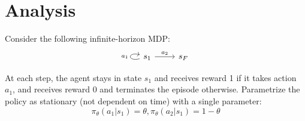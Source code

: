 \documentclass{article}
\begin{document}
\newpage\section{Analysis}
\label{sec:analysis}
Consider the following infinite-horizon MDP:
\[\begin{tikzcd}
	s_1 & {s_F}
	\arrow["{a_2}", from=1-1, to=1-2]
    \arrow["{a_1}", loop left, from=1-1, to=1-1]
\end{tikzcd}\]
\newcommand{\Rmax}[0]{R_{\textrm{max}}}
\newcommand{\E}[0]{\mathbb{E}}
\newcommand{\var}[0]{\textrm{Var}}
\newcommand\question[1][]{\item\refstepcounter{subsection}\label[question]{#1}}

At each step, the agent stays in state $s_1$ and receives reward 1 if it takes action $a_1$, and receives reward 0 and terminates the episode otherwise.
Parametrize the policy as stationary (not dependent on time) with a single parameter:
\[\pi_\theta(a_1|s_1) = \theta, \pi_\theta(a_2|s_1) = 1-\theta\]
\end{document}
